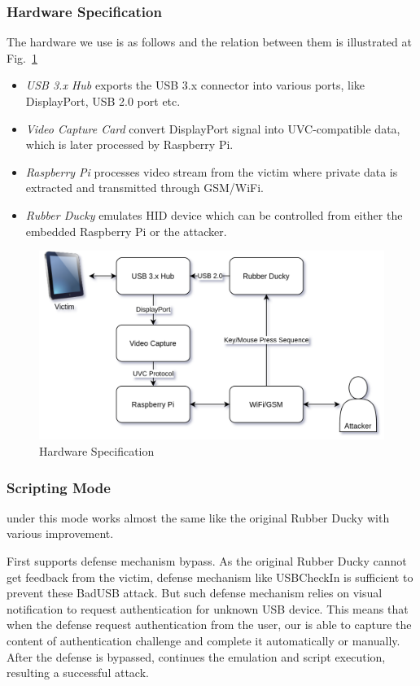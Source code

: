 \subsubsection{Hardware Specification}
The hardware we use is as follows and the relation between them is illustrated at Fig.~\ref{fig:hardware_specification}
\begin{itemize}
	\item\textit{USB 3.x Hub} exports the USB 3.x connector into various ports, like DisplayPort, USB 2.0 port etc.
	\item\textit{Video Capture Card} convert DisplayPort signal into UVC-compatible data, which is later processed by Raspberry Pi.
	\item\textit{Raspberry Pi} processes video stream from the victim where private data is extracted and transmitted through GSM/WiFi.
	\item\textit{Rubber Ducky} emulates HID device which can be controlled from either the embedded Raspberry Pi or the attacker.
\end{itemize}
\begin{figure}[hbtp]
	\includegraphics[width=\linewidth]{./Figs/hardware_specification.png}
	\caption{Hardware Specification}
	\label{fig:hardware_specification}
\end{figure}
\subsubsection{Scripting Mode}
\tool under this mode works almost the same like the original Rubber Ducky with various improvement.

First \tool supports defense mechanism bypass. As the original Rubber Ducky cannot get feedback from the victim, defense mechanism like USBCheckIn \cite{usbcheckin} is sufficient to prevent these BadUSB attack. But such defense mechanism relies on visual notification to request authentication for unknown USB device. This means that when the defense request authentication from the user, our \tool is able to capture the content of authentication challenge and complete it automatically or manually. After the defense is bypassed, \tool continues the emulation and script execution, resulting a successful attack.

